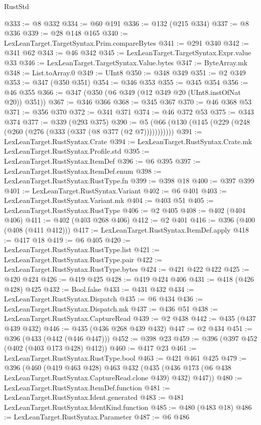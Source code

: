 \begin{lexlean}{RustStd}
\begin{coremodule}
@333 := @8 @332
@334 := @60 @191
@336 := @132 (@215 @334)
@337 := @8 @336
@339 := @28 @148 @165
@340 := LexLeanTarget.TargetSyntax.Prim.compareBytes
@341 := @291 @340
@342 := @341 @62
@343 := @46 @342
@345 := LexLeanTarget.TargetSyntax.Expr.value @33
@346 := LexLeanTarget.TargetSyntax.Value.bytes
@347 := ByteArray.mk
@348 := List.toArray.{0}
@349 := UInt8
@350 := @348 @349
@351 := @2 @349
@353 := @347 (@350 @351)
@354 := @346 @353
@355 := @345 @354
@356 := @46 @355
@366 := @347 (@350 (@6 @349 (@12 @349 @20 (UInt8.instOfNat @20)) @351))
@367 := @346 @366
@368 := @345 @367
@370 := @46 @368 @53
@371 := @356 @370
@372 := @341 @371
@374 := @46 @372 @53
@375 := @343 @374
@377 := @339 (@293 @375)
@390 := @5 (@66 (@130 (@145 (@229 (@248 (@260 (@276 (@333 (@337 (@8 @377 (@2 @7)))))))))))
@391 := LexLeanTarget.RustSyntax.Crate
@394 := LexLeanTarget.RustSyntax.Crate.mk LexLeanTarget.RustSyntax.Profile.std
@395 := LexLeanTarget.RustSyntax.ItemDef
@396 := @6 @395
@397 := LexLeanTarget.RustSyntax.ItemDef.enum
@398 := LexLeanTarget.RustSyntax.RustType.fn
@399 := @398 @18
@400 := @397 @399
@401 := LexLeanTarget.RustSyntax.Variant
@402 := @6 @401
@403 := LexLeanTarget.RustSyntax.Variant.mk
@404 := @403 @51
@405 := LexLeanTarget.RustSyntax.RustType
@406 := @2 @405
@408 := @402 (@404 @406)
@411 := @402 (@403 @268 @406)
@412 := @2 @401
@416 := @396 (@400 (@408 (@411 @412)))
@417 := LexLeanTarget.RustSyntax.ItemDef.apply
@418 := @417 @18
@419 := @6 @405
@420 := LexLeanTarget.RustSyntax.RustType.list
@421 := LexLeanTarget.RustSyntax.RustType.pair
@422 := LexLeanTarget.RustSyntax.RustType.bytes
@424 := @421 @422 @422
@425 := @420 @424
@426 := @419 @425
@428 := @419 @424 @406
@431 := @418 (@426 @428) @425
@432 := Bool.false
@433 := @431 @432
@434 := LexLeanTarget.RustSyntax.Dispatch
@435 := @6 @434
@436 := LexLeanTarget.RustSyntax.Dispatch.mk
@437 := @436 @51
@438 := LexLeanTarget.RustSyntax.CaptureRead
@439 := @2 @438
@442 := @435 (@437 @439 @432)
@446 := @435 (@436 @268 @439 @432)
@447 := @2 @434
@451 := @396 (@433 (@442 (@446 @447)))
@452 := @398 @23
@459 := @396 (@397 @452 (@402 (@403 @173 @428) @412))
@460 := @417 @23
@461 := LexLeanTarget.RustSyntax.RustType.bool
@463 := @421 @461 @425
@479 := @396
    (@460
      (@419 @463 @428)
      @463
      @432
      (@435 (@436 @173 (@6 @438 LexLeanTarget.RustSyntax.CaptureRead.clone @439) @432) @447))
@480 := LexLeanTarget.RustSyntax.ItemDef.function
@481 := LexLeanTarget.RustSyntax.Ident.generated
@483 := @481 LexLeanTarget.RustSyntax.IdentKind.function
@485 := @480 (@483 @18)
@486 := LexLeanTarget.RustSyntax.Parameter
@487 := @6 @486

\end{coremodule}
\end{lexlean}

